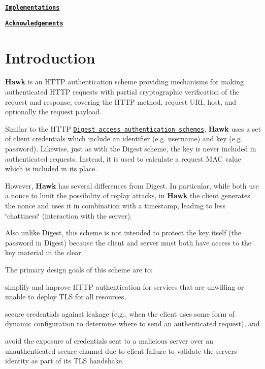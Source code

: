 \begin{DoxyItemize}
\item \href{#implementations}{\tt {\bfseries Implementations}}
\item \href{#acknowledgements}{\tt {\bfseries Acknowledgements}}
\end{DoxyItemize}

\section*{Introduction}

{\bfseries Hawk} is an H\+T\+TP authentication scheme providing mechanisms for making authenticated H\+T\+TP requests with partial cryptographic verification of the request and response, covering the H\+T\+TP method, request U\+RI, host, and optionally the request payload.

Similar to the H\+T\+TP \href{http://www.ietf.org/rfc/rfc2617.txt}{\tt Digest access authentication schemes}, {\bfseries Hawk} uses a set of client credentials which include an identifier (e.\+g. username) and key (e.\+g. password). Likewise, just as with the Digest scheme, the key is never included in authenticated requests. Instead, it is used to calculate a request M\+AC value which is included in its place.

However, {\bfseries Hawk} has several differences from Digest. In particular, while both use a nonce to limit the possibility of replay attacks, in {\bfseries Hawk} the client generates the nonce and uses it in combination with a timestamp, leading to less \char`\"{}chattiness\char`\"{} (interaction with the server).

Also unlike Digest, this scheme is not intended to protect the key itself (the password in Digest) because the client and server must both have access to the key material in the clear.

The primary design goals of this scheme are to\+:
\begin{DoxyItemize}
\item simplify and improve H\+T\+TP authentication for services that are unwilling or unable to deploy T\+LS for all resources,
\item secure credentials against leakage (e.\+g., when the client uses some form of dynamic configuration to determine where to send an authenticated request), and
\item avoid the exposure of credentials sent to a malicious server over an unauthenticated secure channel due to client failure to validate the server\textquotesingle{}s identity as part of its T\+LS handshake.
\end{DoxyItemize}

